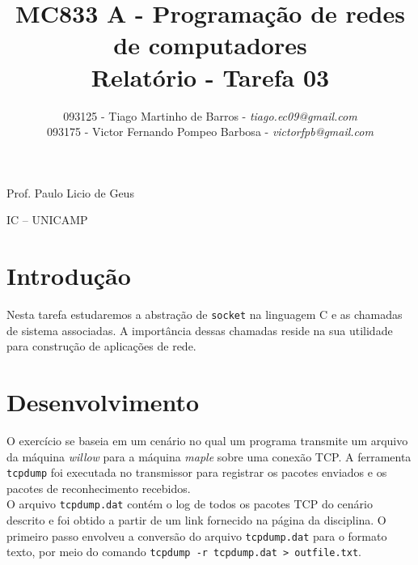 \documentclass[a4paper,10pt]{article}
\begin{document}


\title{MC833 A - Programação de redes de computadores\\
Relatório - Tarefa 03}

\author {   093125 - Tiago Martinho de Barros - \textit{tiago.ec09@gmail.com}\\
            093175 - Victor Fernando Pompeo Barbosa - \textit{victorfpb@gmail.com}}


\maketitle

\centerline{Prof. Paulo Licio de Geus}
\centerline{IC -- UNICAMP}

\vspace{2cm}
\tableofcontents
    
\newpage
\section{Introdução}
\hspace{14pt}

    Nesta tarefa estudaremos a abstração de {\tt socket} na linguagem C e as chamadas de sistema associadas. A importância dessas chamadas reside na sua utilidade para construção de aplicações de rede.


\section{Desenvolvimento}

O exercício se baseia em um cenário no qual um programa transmite um arquivo da máquina \textit{willow} para a máquina \textit{maple} sobre uma conexão TCP. A ferramenta {\tt tcpdump} foi executada no transmissor para registrar os pacotes enviados e os pacotes de reconhecimento recebidos.\\

O arquivo {\tt tcpdump.dat} contém o log de todos os pacotes TCP do cenário descrito e foi obtido a partir de um link fornecido na página da disciplina. O primeiro passo envolveu a conversão do arquivo {\tt tcpdump.dat} para o formato texto, por meio do comando {\tt tcpdump -r tcpdump.dat > outfile.txt}. \\
\end{document}
